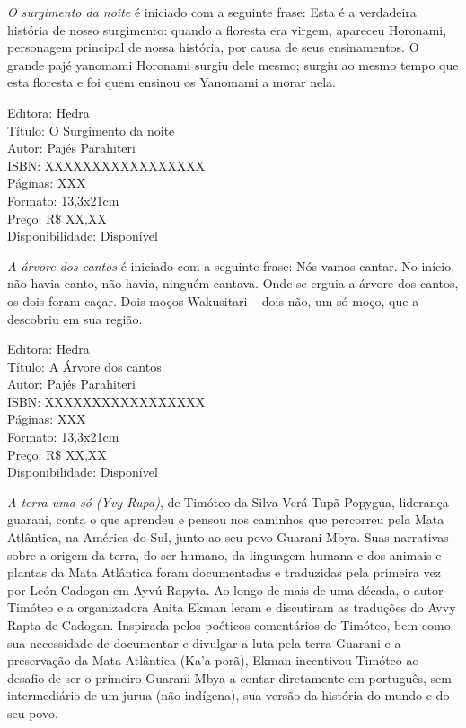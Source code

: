 \pagebreak


\noindent{}\textit{O surgimento da noite} é iniciado com a seguinte frase: Esta é a verdadeira história de nosso surgimento: quando a floresta era virgem, apareceu Horonami, personagem principal de nossa história, por causa de seus ensinamentos. O grande pajé yanomami Horonami surgiu dele mesmo; surgiu ao mesmo tempo que esta floresta e foi quem ensinou os Yanomami a morar nela.

\begin{ficha}
Editora: Hedra\\
Título: O Surgimento da noite\\
Autor:  Pajés Parahiteri\\ 
ISBN: XXXXXXXXXXXXXXXXX\\
Páginas: XXX\\
Formato: 13,3x21cm\\
Preço: R\$ XX,XX\\
Disponibilidade: Disponível
\end{ficha}

\pagebreak


\noindent{}\textit{A árvore dos cantos} é iniciado com a seguinte frase: Nós vamos cantar. No início, não havia canto, não havia, ninguém cantava. Onde se erguia a árvore dos cantos, os dois foram caçar. Dois moços Wakusitari – dois não, um só moço, que a descobriu em sua região.

\begin{ficha}
Editora: Hedra\\
Título: A Árvore dos cantos\\
Autor:  Pajés Parahiteri\\ 
ISBN: XXXXXXXXXXXXXXXXX\\
Páginas: XXX\\
Formato: 13,3x21cm\\
Preço: R\$ XX,XX\\
Disponibilidade: Disponível
\end{ficha}

\pagebreak


\noindent{}\textit{A terra uma só (Yvy Rupa)}, de Timóteo da Silva Verá Tupã Popygua, liderança guarani, conta o que aprendeu e pensou nos caminhos que percorreu pela Mata Atlântica, na América do Sul, junto ao seu povo Guarani Mbya. Suas narrativas sobre a origem da terra, do ser humano, da linguagem humana e dos animais e plantas da Mata Atlântica foram documentadas e traduzidas pela primeira vez por León Cadogan em Ayvú Rapyta. Ao longo de mais de uma década, o autor Timóteo e a organizadora Anita Ekman leram e discutiram as traduções do Avvy Rapta de Cadogan. Inspirada pelos poéticos comentários de Timóteo, bem como sua necessidade de documentar e divulgar a luta pela terra Guarani e a preservação da Mata Atlântica (Ka’a porã), Ekman incentivou Timóteo ao desafio de ser o primeiro Guarani Mbya a contar diretamente em português, sem intermediário de um jurua (não indígena), sua versão da história do mundo e do seu povo.


